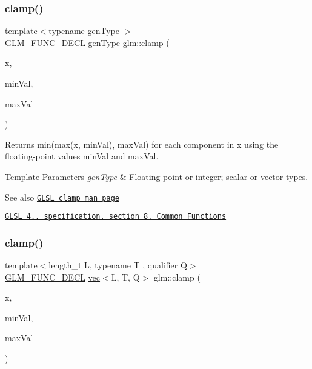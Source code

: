 \subsubsection{\texorpdfstring{clamp()}{clamp()}\hspace{0.1cm}{\footnotesize\ttfamily [1/3]}}
{\footnotesize\ttfamily template$<$typename gen\+Type $>$ \\
\hyperlink{setup_8hpp_ab2d052de21a70539923e9bcbf6e83a51}{G\+L\+M\+\_\+\+F\+U\+N\+C\+\_\+\+D\+E\+CL} gen\+Type glm\+::clamp (\begin{DoxyParamCaption}\item[{gen\+Type}]{x,  }\item[{gen\+Type}]{min\+Val,  }\item[{gen\+Type}]{max\+Val }\end{DoxyParamCaption})}

Returns min(max(x, min\+Val), max\+Val) for each component in x using the floating-\/point values min\+Val and max\+Val.


\begin{DoxyTemplParams}{Template Parameters}
{\em gen\+Type} & Floating-\/point or integer; scalar or vector types.\\
\hline
\end{DoxyTemplParams}
\begin{DoxySeeAlso}{See also}
\href{http://www.opengl.org/sdk/docs/manglsl/xhtml/clamp.xml}{\tt G\+L\+SL clamp man page} 

\href{http://www.opengl.org/registry/doc/GLSLangSpec.4.20.8.pdf}{\tt G\+L\+SL 4.. specification, section 8. Common Functions} 
\end{DoxySeeAlso}
\mbox{\label{group__core__func__common_gabff13e6547edac08f52b4133ff4bf183}} 
\subsubsection{\texorpdfstring{clamp()}{clamp()}\hspace{0.1cm}{\footnotesize\ttfamily [2/3]}}
{\footnotesize\ttfamily template$<$length\+\_\+t L, typename T , qualifier Q$>$ \\
\hyperlink{setup_8hpp_ab2d052de21a70539923e9bcbf6e83a51}{G\+L\+M\+\_\+\+F\+U\+N\+C\+\_\+\+D\+E\+CL} \hyperlink{structglm_1_1vec}{vec}$<$L, T, Q$>$ glm\+::clamp (\begin{DoxyParamCaption}\item[{\hyperlink{structglm_1_1vec}{vec}$<$ L, T, Q $>$ const \&}]{x,  }\item[{T}]{min\+Val,  }\item[{T}]{max\+Val }\end{DoxyParamCaption})}

